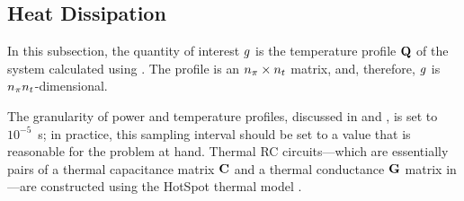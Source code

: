 \subsection{Heat Dissipation}
In this subsection, the quantity of interest $g$ is the temperature profile
$\mathbf{Q}$ of the system calculated using . The profile is an
${n_\pi} \times {n_t}$ matrix, and, therefore, $g$ is ${n_\pi} {n_t}$-dimensional.

The granularity of power and temperature profiles, discussed in
 and , is set to $10^{-5}$~s; in
practice, this sampling interval should be set to a value that is reasonable for
the problem at hand. Thermal RC circuits---which are essentially pairs of a
thermal capacitance matrix $\mathbf{C}$ and a thermal conductance $\mathbf{G}$ matrix in
---are constructed using the HotSpot thermal model
\cite{skadron2004}.

